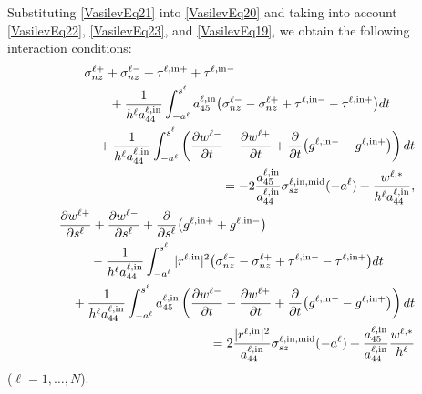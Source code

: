 Substituting \eqref{VasilevEq21} into \eqref{VasilevEq20} and taking into account
\eqref{VasilevEq22}, \eqref{VasilevEq23}, and \eqref{VasilevEq19},
we obtain the following interaction conditions:
\begin{align}
	\notag
	\begin{multlined}[b]
	\sigma_{nz}^{\ell+}
	+
	\sigma_{nz}^{\ell-}
	+
	\tau^{\ell,\mathrm{in}+}
	+
	\tau^{\ell,\mathrm{in}-}
	\\
	+
	\frac{1}{h^{\ell}a_{44}^{\ell,\mathrm{in}}}
	\int_{-a^{\ell}}^{s^{\ell}}
	a_{45}^{\ell,\mathrm{in}}
	\bigl(
	\sigma_{nz}^{\ell-}
	-
	\sigma_{nz}^{\ell+}
	+
	\tau^{\ell,\mathrm{in}-}
	-
	\tau^{\ell,\mathrm{in}+}
	\bigr)dt
	\\
	+
	\frac{1}{h^{\ell}a_{44}^{\ell,\mathrm{in}}}
	\int_{-a^{\ell}}^{s^{\ell}}
	\left(
	\frac{\partial w^{\ell-}}{\partial t}
	-
	\frac{\partial w^{\ell+}}{\partial t}
	+
	\frac{\partial}{\partial t}
	\bigl(
	g^{\ell,\mathrm{in}-}
	-
	g^{\ell,\mathrm{in}+}
	\bigr)
	\right)dt
	\end{multlined}
	\\
	=
	-2\frac{a_{45}^{\ell,\mathrm{in}}}{a_{44}^{\ell,\mathrm{in}}}
	\sigma_{sz}^{\ell,\mathrm{in,mid}}(-a^{\ell})
	+
	\frac{w^{\ell,*}}{h^{\ell}a_{44}^{\ell,\mathrm{in}}},
	\label{VasilevEq24}
\\
\notag
\begin{multlined}[b]
	\frac{\partial w^{\ell+}}{\partial s^{\ell}}
	+
	\frac{\partial w^{\ell-}}{\partial s^{\ell}}
	+
	\frac{\partial}{\partial s^{\ell}}
	\bigl(
	g^{\ell,\mathrm{in}+}
	+
	g^{\ell,\mathrm{in}-}
	\bigr)
	\\
	-
	\frac{1}{h^{\ell}a_{44}^{\ell,\mathrm{in}}}
	\int_{-a^{\ell}}^{s^{\ell}}
	|r^{\ell,\mathrm{in}}|^{2}
	\bigl(
	\sigma_{nz}^{\ell-}
	-
	\sigma_{nz}^{\ell+}
	+
	\tau^{\ell,\mathrm{in}-}
	-
	\tau^{\ell,\mathrm{in}+}
	\bigr)dt
	\\
	+
	\frac{1}{h^{\ell}a_{44}^{\ell,\mathrm{in}}}
	\int_{-a^{\ell}}^{s^{\ell}}
	a_{45}^{\ell,\mathrm{in}}
	\left(
	\frac{\partial w^{\ell-}}{\partial t}
	-
	\frac{\partial w^{\ell+}}{\partial t}
	+
	\frac{\partial}{\partial t}
	\bigl(
	g^{\ell,\mathrm{in}-}
	-
	g^{\ell,\mathrm{in}+}
	\bigr)
	\right)dt
	\end{multlined}
	\\
	=
	2\frac{|r^{\ell,\mathrm{in}}|^{2}}{a_{44}^{\ell,\mathrm{in}}}
	\sigma_{sz}^{\ell,\mathrm{in,mid}}(-a^{\ell})
	+
	\frac{a_{45}^{\ell,\mathrm{in}}}{a_{44}^{\ell,\mathrm{in}}}
	\frac{w^{\ell,*}}{h^{\ell}}
	\label{VasilevEq25}
\end{align}
%
($\ell=1,\ldots,N$).

